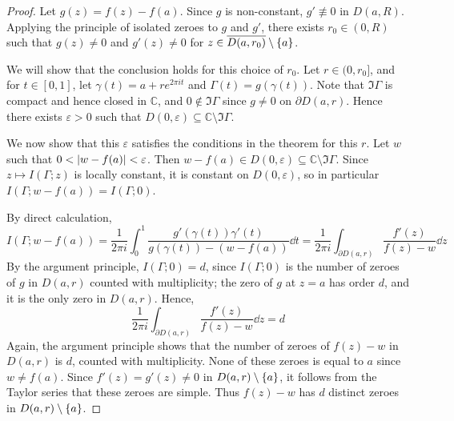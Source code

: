 \begin{proof}
	Let \( g(z) = f(z) - f(a) \).
	Since \( g \) is non-constant, \( g' \not\equiv 0 \) in \( D(a,R) \).
	Applying the principle of isolated zeroes to \( g \) and \( g' \), there exists \( r_0 \in (0,R) \) such that \( g(z) \neq 0 \) and \( g'(z) \neq 0 \) for \( z \in \overline{D(a,r_0)} \setminus \qty{a} \).

	We will show that the conclusion holds for this choice of \( r_0 \).
	Let \( r \in (0,r_0] \), and for \( t \in [0,1] \), let \( \gamma(t) = a + re^{2\pi i t} \) and \( \Gamma(t) = g(\gamma(t)) \).
	Note that \( \Im \Gamma \) is compact and hence closed in \( \mathbb C \), and \( 0 \not\in \Im \Gamma \) since \( g \neq 0 \) on \( \partial D(a,r) \).
	Hence there exists \( \varepsilon > 0 \) such that \( D(0,\varepsilon) \subseteq \mathbb C \setminus \Im \Gamma \).

	We now show that this \( \varepsilon \) satisfies the conditions in the theorem for this \( r \).
	Let \( w \) such that \( 0 < \abs{w-f(a)} < \varepsilon \).
	Then \( w-f(a) \in D(0,\varepsilon) \subseteq \mathbb C \setminus \Im \Gamma \).
	Since \( z \mapsto I(\Gamma;z) \) is locally constant, it is constant on \( D(0,\varepsilon) \), so in particular \( I(\Gamma;w-f(a)) = I(\Gamma;0) \).

	By direct calculation,
	\[
		I(\Gamma;w-f(a)) = \frac{1}{2\pi i} \int_0^1 \frac{g'(\gamma(t)) \gamma'(t)}{g(\gamma(t)) - (w-f(a))} \dd{t} = \frac{1}{2\pi i} \int_{\partial D(a,r)} \frac{f'(z)}{f(z) - w} \dd{z}
	\]
	By the argument principle, \( I(\Gamma;0) = d \), since \( I(\Gamma;0) \) is the number of zeroes of \( g \) in \( D(a,r) \) counted with multiplicity; the zero of \( g \) at \( z = a \) has order \( d \), and it is the only zero in \( D(a,r) \).
	Hence,
	\[
		\frac{1}{2\pi i} \int_{\partial D(a,r)} \frac{f'(z)}{f(z) - w} \dd{z} = d
	\]
	Again, the argument principle shows that the number of zeroes of \( f(z) - w \) in \( D(a,r) \) is \( d \), counted with multiplicity.
	None of these zeroes is equal to \( a \) since \( w \neq f(a) \).
	Since \( f'(z) = g'(z) \neq 0 \) in \( D(a,r) \setminus \qty{a} \), it follows from the Taylor series that these zeroes are simple.
	Thus \( f(z) - w \) has \( d \) distinct zeroes in \( D(a,r) \setminus \qty{a} \).
\end{proof}

